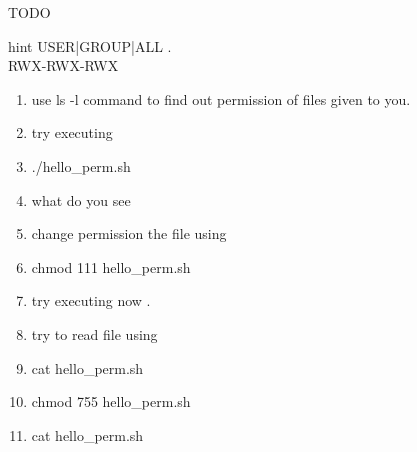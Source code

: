 \documentclass{beamer}
\begin{document}
{%
	\begin{frame}{TODO}
		\begin{block}{hint}
		USER|GROUP|ALL . \\
		 RWX-RWX-RWX\\
		\end{block}
		\begin{enumerate}
			\item<1->	use ls -l command to find out permission of files given to you.
			\item<2->	try executing 
			\item<2->		./hello\_perm.sh 
			\item<2->	what do you see
			\item<3->	change permission the file using 
			\item<3->		chmod 111 hello\_perm.sh
			\item<3->	try executing now  . 
			\item<4->	try to read file using 
			\item<4->	cat hello\_perm.sh
			\item<4->		chmod 755 hello\_perm.sh 
			\item<4->	cat hello\_perm.sh
		\end{enumerate}

	\end{frame}
}
\end{document}
